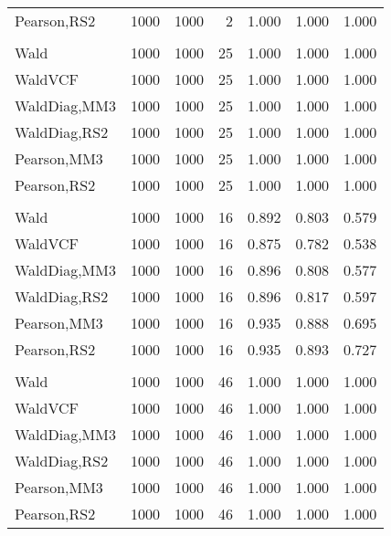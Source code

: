 \documentclass[
]{article}
\begin{document}
\begin{table}[H]
{\begin{tabular}[t]{lrrrrrr}
\hspace{1em}Pearson,RS2 & 1000 & 1000 & 2 & 1.000 & 1.000 & 1.000\\
\addlinespace[0.3em]
\multicolumn{7}{l}{\textbf{1F 15V}}\\
\hspace{1em}Wald & 1000 & 1000 & 25 & 1.000 & 1.000 & 1.000\\
\hspace{1em}WaldVCF & 1000 & 1000 & 25 & 1.000 & 1.000 & 1.000\\
\hspace{1em}WaldDiag,MM3 & 1000 & 1000 & 25 & 1.000 & 1.000 & 1.000\\
\hspace{1em}WaldDiag,RS2 & 1000 & 1000 & 25 & 1.000 & 1.000 & 1.000\\
\hspace{1em}Pearson,MM3 & 1000 & 1000 & 25 & 1.000 & 1.000 & 1.000\\
\hspace{1em}Pearson,RS2 & 1000 & 1000 & 25 & 1.000 & 1.000 & 1.000\\
\addlinespace[0.3em]
\multicolumn{7}{l}{\textbf{2F 10V}}\\
\hspace{1em}Wald & 1000 & 1000 & 16 & 0.892 & 0.803 & 0.579\\
\hspace{1em}WaldVCF & 1000 & 1000 & 16 & 0.875 & 0.782 & 0.538\\
\hspace{1em}WaldDiag,MM3 & 1000 & 1000 & 16 & 0.896 & 0.808 & 0.577\\
\hspace{1em}WaldDiag,RS2 & 1000 & 1000 & 16 & 0.896 & 0.817 & 0.597\\
\hspace{1em}Pearson,MM3 & 1000 & 1000 & 16 & 0.935 & 0.888 & 0.695\\
\hspace{1em}Pearson,RS2 & 1000 & 1000 & 16 & 0.935 & 0.893 & 0.727\\
\addlinespace[0.3em]
\multicolumn{7}{l}{\textbf{3F 15V}}\\
\hspace{1em}Wald & 1000 & 1000 & 46 & 1.000 & 1.000 & 1.000\\
\hspace{1em}WaldVCF & 1000 & 1000 & 46 & 1.000 & 1.000 & 1.000\\
\hspace{1em}WaldDiag,MM3 & 1000 & 1000 & 46 & 1.000 & 1.000 & 1.000\\
\hspace{1em}WaldDiag,RS2 & 1000 & 1000 & 46 & 1.000 & 1.000 & 1.000\\
\hspace{1em}Pearson,MM3 & 1000 & 1000 & 46 & 1.000 & 1.000 & 1.000\\
\hspace{1em}Pearson,RS2 & 1000 & 1000 & 46 & 1.000 & 1.000 & 1.000\\
\bottomrule
\end{tabular}}
\endgroup{}
\end{table}
\end{document}
